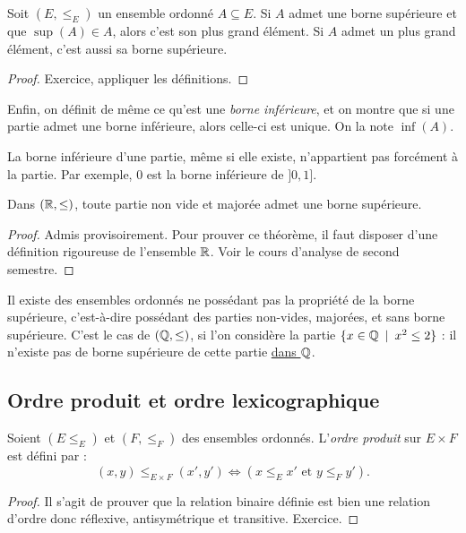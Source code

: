 \begin{proposition}
Soit $(E,\leq_E)$ un ensemble ordonné $A\subseteq E$.
Si $A$ admet une borne supérieure et que $\sup(A) \in A$, alors c'est son plus grand élément.
Si $A$ admet un plus grand élément, c'est aussi sa borne supérieure.
\end{proposition}
\begin{proof}
Exercice, appliquer les définitions.
\end{proof}

Enfin, on définit de même ce qu'est une \emph{borne inférieure}, et on montre que si une partie admet une borne inférieure, alors celle-ci est unique. On la note $\inf(A)$. 

La borne inférieure d'une partie, même si elle existe, n'appartient pas forcément à la partie. Par exemple, $0$ est la borne inférieure de $]0,1]$.

\begin{theoreme}
Dans $(\mathbb{R},\leq)$, toute partie non vide et majorée admet une borne supérieure.
\end{theoreme}
\begin{proof}
Admis provisoirement. Pour prouver ce théorème, il faut disposer d'une définition rigoureuse de l'ensemble $\mathbb{R}$. Voir le cours d'analyse de second semestre.
\end{proof}

Il existe des ensembles ordonnés ne possédant pas la propriété de la borne supérieure, c'est-à-dire possédant des parties non-vides, majorées, et sans borne supérieure. C'est le cas de $(\mathbb{Q},\leq)$, si l'on considère la partie $\{x\in \mathbb{Q}\:\mid\: x^2\leq 2\}$ : il n'existe pas de borne supérieure de cette partie \underline{dans $\mathbb{Q}$}.


\subsection{Ordre produit et ordre lexicographique}

\begin{propdef}
Soient $(E\leq_E)$ et $(F,\leq_F)$ des ensembles ordonnés.
L'\emph{ordre produit} sur $E\times F$ est défini par :
\[
(x,y) \leq_{E\times F} (x',y') \iff \left(x\leq_E x' \text{ et } y\leq_F y'\right).
\]
\end{propdef}
\begin{proof}
Il s'agit de prouver que la relation binaire définie est bien une relation d'ordre donc réflexive, antisymétrique et transitive. Exercice.
\end{proof}

